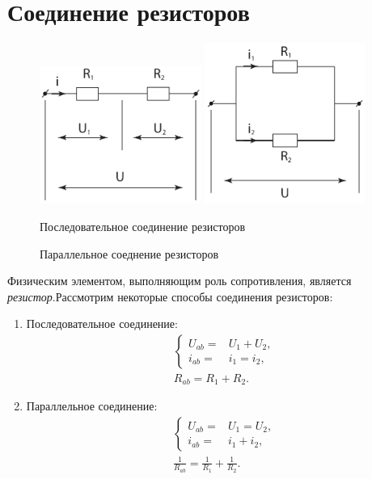 \section{Соединение резисторов}
    \begin{figure}[b!]
    \center
    \includegraphics[width=0.47\textwidth]{lec06/R_serial.pdf}
    \hfill
    \includegraphics[width=0.47\textwidth]{lec06/R_parallel.pdf}
    \parbox[t]{.47\textwidth}{\caption{Последовательное соединение
                                                        резисторов}}
    \hfill
    \parbox[t]{.47\textwidth}{\caption{Параллельное соеднение резисторов}}
    \end{figure}

    Физическим элементом, выполняющим роль сопротивления, является
    \textit{резистор}.Рассмотрим некоторые способы соединения резисторов:
    
    \begin{enumerate}
        \item Последовательное соединение:
        \begin{align*} 
        & \left\{
        \begin{array}{rl}
            U_{ab} = & U_1 + U_2, \\
            i_{ab} = & i_1 = i_2,
        \end{array} \right. \\
        & R_{ab} = R_1 + R_2.
        \end{align*}
        \item Параллельное соединение:
        \begin{align*} 
        & \left\{
        \begin{array}{rl}
            U_{ab} = & U_1 = U_2, \\
            i_{ab} = & i_1 + i_2,
        \end{array} \right. \\
        & \frac{1}{R_{ab}} = \frac{1}{R_1} + \frac{1}{R_2}. \nonumber
        \end{align*}
    \end{enumerate}
    
